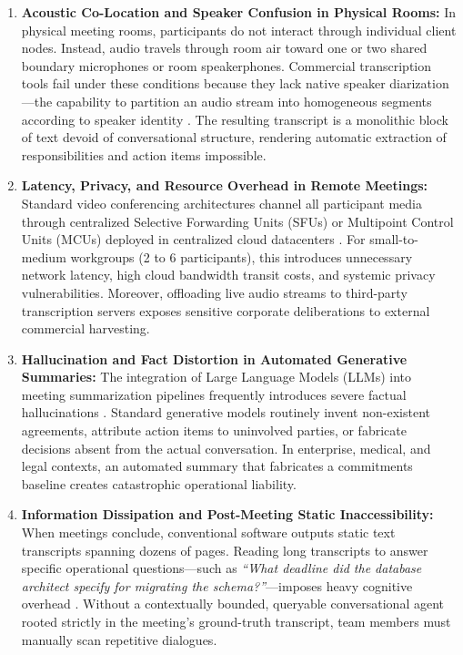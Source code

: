\documentclass[12pt,oneside,letterpaper]{report}
\numberwithin{equation}{chapter} %
\begin{document}
\begin{enumerate}
    \item \textbf{Acoustic Co-Location and Speaker Confusion in Physical Rooms:} In physical meeting rooms, participants do not interact through individual client nodes. Instead, audio travels through room air toward one or two shared boundary microphones or room speakerphones. Commercial transcription tools fail under these conditions because they lack native speaker diarization---the capability to partition an audio stream into homogeneous segments according to speaker identity \cite{anguera2012speaker}. The resulting transcript is a monolithic block of text devoid of conversational structure, rendering automatic extraction of responsibilities and action items impossible.
    
    \item \textbf{Latency, Privacy, and Resource Overhead in Remote Meetings:} Standard video conferencing architectures channel all participant media through centralized Selective Forwarding Units (SFUs) or Multipoint Control Units (MCUs) deployed in centralized cloud datacenters \cite{garcia2021architectural}. For small-to-medium workgroups (2 to 6 participants), this introduces unnecessary network latency, high cloud bandwidth transit costs, and systemic privacy vulnerabilities. Moreover, offloading live audio streams to third-party transcription servers exposes sensitive corporate deliberations to external commercial harvesting.
    
    \item \textbf{Hallucination and Fact Distortion in Automated Generative Summaries:} The integration of Large Language Models (LLMs) into meeting summarization pipelines frequently introduces severe factual hallucinations \cite{ji2023survey}. Standard generative models routinely invent non-existent agreements, attribute action items to uninvolved parties, or fabricate decisions absent from the actual conversation. In enterprise, medical, and legal contexts, an automated summary that fabricates a commitments baseline creates catastrophic operational liability.
    
    \item \textbf{Information Dissipation and Post-Meeting Static Inaccessibility:} When meetings conclude, conventional software outputs static text transcripts spanning dozens of pages. Reading long transcripts to answer specific operational questions---such as \textit{``What deadline did the database architect specify for migrating the schema?''}---imposes heavy cognitive overhead \cite{fung2023contextual}. Without a contextually bounded, queryable conversational agent rooted strictly in the meeting's ground-truth transcript, team members must manually scan repetitive dialogues.
\end{enumerate}
\end{document}
